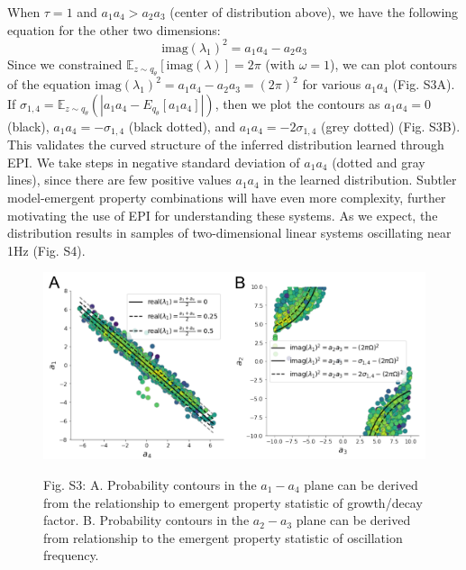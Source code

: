 \documentclass[11pt]{article}
\begin{document}
When $\tau=1$ and $a_1 a_4 > a_2 a_3$ (center of distribution above), we have the following equation for the other two dimensions:
\begin{equation}
\text{imag}(\lambda_1)^2 = a_1 a_4 - a_2 a_3
\end{equation}
Since we constrained $\mathbb{E}_{z \sim q_\theta}\left[\text{imag}(\lambda)\right] = 2 \pi$ (with $\omega=1$), we can plot contours of the equation $\text{imag}(\lambda_1)^2 = a_1 a_4 - a_2 a_3 = (2 \pi)^2$ for various $a_1 a_4$ (Fig. S3A). If $\sigma_{1,4} = \mathbb{E}_{z \sim q_\theta}(|a_1 a_4 - E_{q_\theta}[a_1 a_4]|)$, then we plot the contours as $a_1 a_4 = 0$ (black), $a_1 a_4 = -\sigma_{1,4}$ (black dotted), and $a_1 a_4 = -2\sigma_{1,4}$ (grey dotted) (Fig. S3B). This validates the curved structure of the inferred distribution learned through EPI.  We take steps in negative standard deviation of $a_1 a_4$ (dotted and gray lines), since there are few positive values $a_1 a_4$ in the learned distribution.  Subtler model-emergent property combinations will have even more complexity, further motivating the use of EPI for understanding these systems.  As we expect, the distribution results in samples of two-dimensional linear systems oscillating near 1Hz (Fig. S4).

\begin{figure}
\begin{center}
\includegraphics[scale=0.5]{figures/figS3/figS3.pdf}
\end{center}
\begin{flushleft}
Fig. S3: A. Probability contours in the $a_1-a_4$ plane can be derived from the relationship to emergent property statistic of growth/decay factor. B. Probability contours in the $a_2-a_3$ plane can be derived from relationship to the emergent property statistic of oscillation frequency.
\end{flushleft}
\end{figure}
\end{document}
